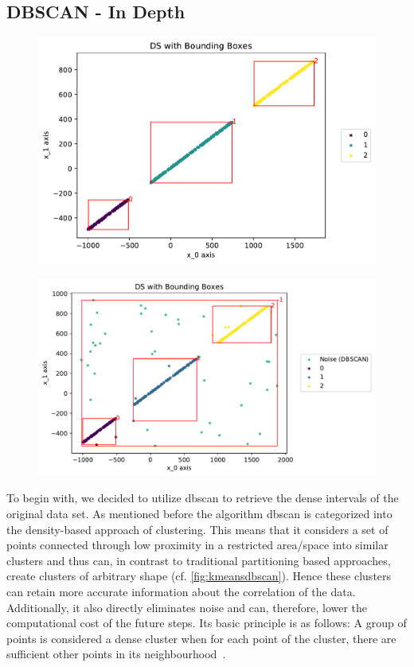 \subsection{DBSCAN - In Depth}
\label{ssec:DBSCANindepth}
\begin{figure}
    \centering
    \begin{minipage}{.47\textwidth}
      \centering
      \includegraphics[width=.8\textwidth]{figures/DSwithDBSCANBoundingBoxes.pdf}
      \captionsetup{width=0.8\linewidth}
      \label{fig:cleandbscan}
    \end{minipage}%
    \begin{minipage}{.53 \textwidth}
      \centering
      \includegraphics[width=.8\textwidth]{figures/DBSCANwithNoise.pdf}
      \captionsetup{width=0.8\linewidth}
      \label{fig:noisydbscan}
    \end{minipage}
\end{figure}
To begin with, we decided to utilize \gls{dbscan} to retrieve the dense intervals of the original data set. 
As mentioned before the algorithm \gls{dbscan} is categorized into the density-based approach of clustering. 
This means that it considers a set of points connected through low proximity in a restricted area/space into similar clusters and thus can, in contrast to traditional partitioning based approaches, create clusters of arbitrary shape (cf. \autoref{fig:kmeansdbscan}). 
Hence these clusters can retain more accurate information about the correlation of the data. Additionally, it also directly eliminates noise and can, therefore, lower the computational cost of the future steps. 
Its basic principle is as follows:
A group of points is considered a dense cluster when for each point of the cluster, there are sufficient other points in its neighbourhood~\cite{DBSCANEKSX96}.

